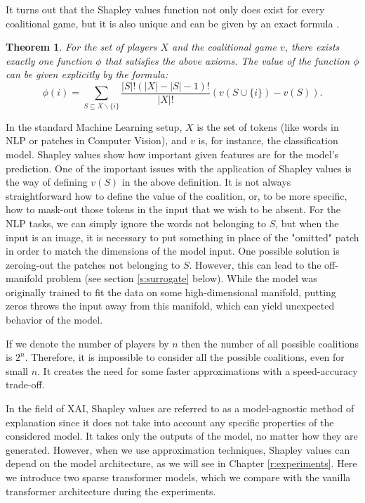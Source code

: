 \documentclass[en]{pracamgr}
\newtheorem{thm}{Theorem}[section]
\begin{document}
It turns out that the Shapley values function not only does exist for every coalitional game, but it is also unique and can be given by an exact formula \cite{ShapleyValues}.

\begin{thm}\label{shap_def}
  For the set of players $X$ and the coalitional game $v$, there exists exactly one function $\phi$ that satisfies the above axioms.
The value of the function $\phi$ can be given explicitly by the formula:
  \begin{equation*}
      \phi (i) = \sum_{S\subseteq X\backslash \{i\}} \frac{|S|!(|X|-|S|-1)!}{|X|!}\left(v(S \cup \{i\}) - v(S)\right).
  \end{equation*}
\end{thm}

In the standard Machine Learning setup, $X$ is the set of tokens (like words in NLP or patches in Computer Vision), and $v$ is, for instance, the classification model. Shapley values show how important given features are for the model's prediction. One of the important issues with the application of Shapley values is the way of defining $v(S)$ in the above definition. It is not always straightforward how to define the value of the coalition, or, to be more specific, how to mask-out those tokens in the input that we wish to be absent. For the NLP tasks, we can simply ignore the words not belonging to $S$, but when the input is an image, it is necessary to put something in place of the "omitted" patch in order to match the dimensions of the model input. One possible solution is zeroing-out the patches not belonging to $S$. However, this can lead to the off-manifold problem (see section \ref{s:surrogate} below). While the model was originally trained to fit the data on some high-dimensional manifold, putting zeros throws the input away from this manifold, which can yield unexpected behavior of the model.



If we denote the number of players by $n$ then the number of all possible coalitions is $2^n$. Therefore, it is impossible to consider all the possible coalitions, even for small $n$. It creates the need for some faster approximations with a speed-accuracy trade-off.


In the field of XAI, Shapley values are referred to as a model-agnostic method of explanation since it does not take into account any specific properties of the considered model. It takes only the outputs of the model, no matter how they are generated. However, when we use approximation techniques, Shapley values can depend on the model architecture, as we will see in Chapter \ref{r:experiments}. Here we introduce two sparse transformer models, which we compare with the vanilla transformer architecture during the experiments.
\end{document}

